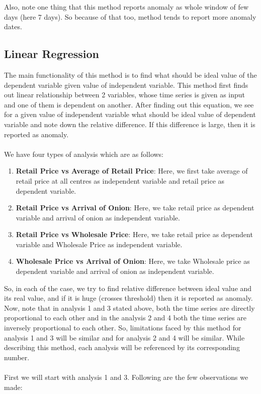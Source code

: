 \documentclass[a4paper,10pt]{report}
\begin{document}
	Also, note one thing that this method reports anomaly as whole window of few days (here 7 days). So because of that too, method tends to report more anomaly dates.


\subsection{Linear Regression}

		The main functionality of this method is to find what should be ideal value of the dependent variable given value of independent variable. This method first finds out linear relationship between 2 variables, whose time series is given as input and one of them is dependent on another. After finding out this equation, we see for a given value of independent variable what should be ideal value of dependent variable and note down the relative difference. If this difference is large, then it is reported as anomaly.\\
		\\
		We have four types of analysis which are as follows:
		\begin{enumerate}
			\item \textbf{Retail Price vs Average of Retail Price}: Here, we first take average of retail price at all centres as independent variable and retail price as dependent variable.			
			\item \textbf{Retail Price vs Arrival of Onion}: Here, we take retail price as dependent variable and arrival of onion as independent variable.
			\item \textbf{Retail Price vs Wholesale Price}: Here, we take retail price as dependent variable and Wholesale Price as independent variable.
			\item \textbf{Wholesale Price vs Arrival of Onion}: Here, we take Wholesale price as dependent variable and arrival of onion as independent variable.
		\end{enumerate}
		
		So, in each of the case, we try to find relative difference between ideal value and its real value, and if it is huge (crosses threshold) then it is reported as anomaly. Now, note that in analysis 1 and 3 stated above, both the time series are directly proportional to each other and in the analysis 2 and 4 both the time series are inversely proportional to each other. So, limitations faced by this method for analysis 1 and 3 will be similar and for analysis 2 and 4 will be similar. While describing this method, each analysis will be referenced by its corresponding number.\\
		\\
		First we will start with analysis 1 and 3. Following are the few observations we made:
		
\end{document}
